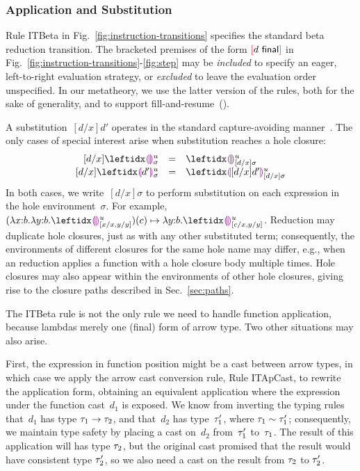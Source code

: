 

\subsubsection{Application and Substitution} 
%
Rule {ITBeta} in Fig.~\ref{fig:instruction-transitions} specifies the
standard beta reduction transition.
%
The bracketed premises of the form ${\textcolor{red}[}d~\mathsf{final}{\textcolor{red}]}$ in
Fig.~\ref{fig:instruction-transitions}-\ref{fig:step} may be \emph{included}
to specify an eager, left-to-right evaluation strategy, or \emph{excluded} to
leave the evaluation order unspecified.
%
In our metatheory, we use the latter version of the rules, both for
the sake of generality, and to support fill-and-resume~().

A substitution~$[d/x]d'$ operates in the standard capture-avoiding manner~\cite{pfpl}. 
%
The only cases of special interest arise when substitution reaches a hole closure:
\[
\begin{array}{rcl}
  [d/x]\dehole{u}{\sigma}{} & = & \dehole{u}{[d/x]\sigma}{} \\%
  \substitute{d}{x}{\dhole{d'}{u}{\sigma}{}} & = & \dhole{[d/x]d'}{u}{[d/x]\sigma}{}
\end{array}
\]
In both cases, we write~$[d/x]\sigma$ to perform substitution on each expression in the hole environment~$\sigma$. 
%
For example, $\stepsToD{}
    {\hap{(\halam{x}{b}{\halam{y}{b}{\dehole{u}{[x/x, y/y]}{}}})}{c}}
    {\halam{y}{b}{\dehole{u}{[c/x, y/y]}{}}}$. 
%
Reduction may duplicate hole closures, just as with any other substituted term;
%
consequently, the environments of different closures for the same hole name may differ, 
e.g., when an reduction applies a function with a hole closure body multiple times.%
%
Hole closures may also appear within the environments of other hole
closures, giving rise to the closure paths described in
Sec.~\ref{sec:paths}.

The ITBeta rule is not the only rule we need to handle function
application, because lambdas merely one (final) form of arrow type.
%
Two other situations may also arise.

First, the expression in function position might be a cast between
arrow types, in which case we apply the arrow cast conversion rule,
Rule {ITApCast}, to rewrite the application form, obtaining an
equivalent application where the expression under the function
cast~$d_1$ is exposed.
%
We know from inverting the typing rules that~$d_1$ has type
$\tau_1 \rightarrow \tau_2$, and that~$d_2$ has type~$\tau_1'$, where
$\tau_1 \sim \tau_1'$; consequently, we maintain type
safety by placing a cast on~$d_2$ from~$\tau_1'$ to~$\tau_1$.
%
The result of this application will has type $\tau_2$, but the
original cast promised that the result would have consistent type
$\tau_2'$, so we also need a cast on the result from $\tau_2$ to
$\tau_2'$.

